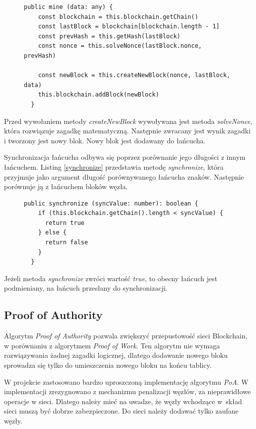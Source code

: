 \documentclass[a4paper,12pt]{book}
\begin{document}
\begin{figure}  
  \centering
\begin{lstlisting}[style=ES6, caption={Dodawanie nowego bloku. Metoda \textit{mine}.},label={mine}]
  public mine (data: any) {
    const blockchain = this.blockchain.getChain()
    const lastBlock = blockchain[blockchain.length - 1]
    const prevHash = this.getHash(lastBlock)
    const nonce = this.solveNonce(lastBlock.nonce, prevHash)

    const newBlock = this.createNewBlock(nonce, lastBlock, data)
    this.blockchain.addBlock(newBlock)
  }
\end{lstlisting}
\end{figure}
Przed wywołaniem metody \textit{createNewBlock} wywoływana jest metoda \textit{solveNonce}, która rozwiązuje zagadkę matematyczną. Następnie zwracany jest wynik zagadki i tworzony jest nowy blok. Nowy blok jest dodawany do łańcucha.

Synchronizacja łańcucha odbywa się poprzez porównanie jego długości z innym łańcuchem. Listing \ref{synchronize} przedstawia metodę \textit{synchronize}, która przyjmuje jako argument długość porównywanego łańcucha znaków. Następnie porównuje ją z łańcuchem bloków węzła.

\begin{figure}  
  \centering
\begin{lstlisting}[style=ES6, caption={Metoda \textit{synchronize}.},label={synchronize}]
  public synchronize (syncValue: number): boolean {
    if (this.blockchain.getChain().length < syncValue) {
      return true
    } else {
      return false
    }
  }
\end{lstlisting}
\end{figure}
Jeżeli metoda \textit{synchronize} zwróci wartość \textit{true}, to obecny łańcuch jest podmieniany, na łańcuch przesłany do synchronizacji.
 
\subsection{Proof of Authority}
Algorytm \textit{Proof of Authority} pozwala zwiększyć przepustowość sieci Blockchain, w porównaniu z algorytmem \textit{Proof of Work}. Ten algorytm nie wymaga rozwiązywania żadnej zagadki logicznej, dlatego dodawanie nowego bloku sprowadza się tylko do umieszczenia nowego bloku na końcu tablicy. 
 
W projekcie zastosowano bardzo uproszczoną implementację algorytmu \textit{PoA}. W implementacji zrezygnowano z mechanizmu penalizacji węzłów, za nieprawidłowe operacje w sieci. Dlatego należy mieć na uwadze, że węzły wchodzące w~skład sieci muszą być dobrze zabezpieczone. Do sieci należy dodawać tylko zaufane węzły.
 
\end{document}
